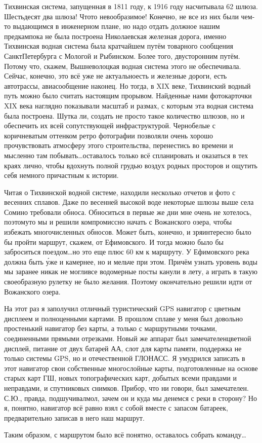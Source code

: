 Тихвинская система, запущенная в 1811 году, к 1916 году насчитывала 62 шлюза. Шестьдесят два шлюза! Что\sdash то невообразимое! Конечно, не все из них были чем-то выдающимся в инженерном плане, но надо отдать должное нашим предкам\mdash пока не была построена Николаевская железная дорога, именно Тихвинская водная система была кратчайшем путём товарного сообщения Санкт\sdash Петербурга с Мологой и Рыбинском. Более того, двусторонним путём. Потому что, скажем, Вышневолоцкая водная система этого не обеспечивала. Сейчас, конечно, это всё уже не актуально\mdash есть и железные дороги, есть автотрассы, авиасообщение наконец. Но тогда, в XIX веке, Тихвинский водный путь можно было считать настоящим прорывом. Найденные нами фотокарточки XIX века наглядно показывали масштаб и размах, с которым эта водная система была построена. Шутка ли, создать не просто такое количество шлюзов, но и обеспечить их всей сопутствующей инфраструктурой. Черно\sdash белые с коричневатым оттенком ретро фотографии позволяли очень хорошо прочувствовать атмосферу этого строительства, перенестись во времени и мысленно там побывать\ldots оставалось только всё спланировать и оказаться в тех краях лично, чтобы вдохнуть полной грудью воздух родных просторов и ощутить себя немного причастным к истории.

Читая о Тихвинской водной системе, находили несколько отчетов и фото с весенних сплавов. Даже по весенней высокой воде некоторые шлюзы выше села Сомино требовали обноса. Обноситься в первые же дни мне очень не хотелось, поэтому\sdash то мы и решили компромиссно начать с Вожанского озера, чтобы избежать многочисленных обносов. Может быть, конечно, и зря\mdash интересно было бы пройти маршрут, скажем, от Ефимовского. И тогда можно было бы заброситься поездом\ldots но это еще плюс 60 км к маршруту. У Ефимовского река должна быть \'{у}же и камернее, но и мельче при этом. Причём узнать уровень воды мы заранее никак не могли\mdash все водомерные посты канули в лету, а играть в такую своеобразную рулетку не было желания. Поэтому окончательно решили идти от Вожанского озера. 

На этот раз я заполучил отличный туристический GPS навигатор с цветным дисплеем и полноценными картами. В прошлом сплаве у меня был довольно простенький навигатор без карты, а только с маршрутными точками, соединенными прямыми отрезками. Новый же аппарат был замечателен\mdash цветной дисплей, питание от двух батарей АА, слот для карты памяти, поддержка не только системы GPS, но и отечественной ГЛОНАСС. Я умудрился записать в этот навигатор свои собственные многослойные карты, подготовленные на основе старых карт ГШ, новых топографических карт, добытых всеми правдами и неправдами, и спутниковых снимков. Прибор, что ни говори, был замечателен. С.Ю., правда, подшучивал\mdash мол, зачем он и куда мы денемся с реки в сторону?  Но я, понятно, навигатор всё равно взял с собой вместе с запасом батареек, предварительно записав в него наш маршрут.

Таким образом, с маршрутом было всё понятно, оставалось собрать команду\ldots

\begin{center}
\end{center}
